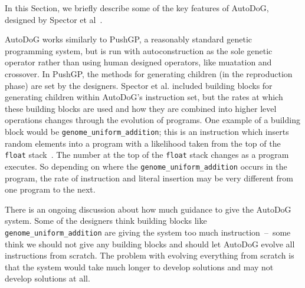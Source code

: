 \documentclass{sig-alternate}
\begin{document}
In this Section, we briefly describe some of the key features of AutoDoG, designed by Spector et al~\cite{spector:2016}.


AutoDoG works similarly to PushGP, a reasonably standard genetic programming system, but is run with autoconstruction as the sole genetic operator rather than using human designed operators, like muatation and crossover. In PushGP, the methods for generating children (in the reproduction phase) are set by the designers. Spector et al. included building blocks for generating children within AutoDoG's instruction set, but the rates at which these building blocks are used and how they are combined into higher level operations changes through the evolution of programs. One example of a building block would be \texttt{genome\_uniform\_addition}; this is an instruction which inserts random elements into a program with a likelihood taken from the top of the \texttt{float} stack~\cite{clojush}. The number at the top of the \texttt{float} stack changes as a program executes. So depending on where the \texttt{genome\_uniform\_addition} occurs in the program, the rate of instruction and literal insertion may be very different from one program to the next.

There is an ongoing discussion about how much guidance to give the AutoDoG system. Some of the designers think building blocks like \texttt{genome\_uniform\_addition} are giving the system too much instruction~--~some think we should not give any building blocks and should let AutoDoG evolve all instructions from scratch. The problem with evolving everything from scratch is that the system would take much longer to develop solutions and may not develop solutions at all.~\cite{lee:2001,clojush,spector:2016}
\end{document}
